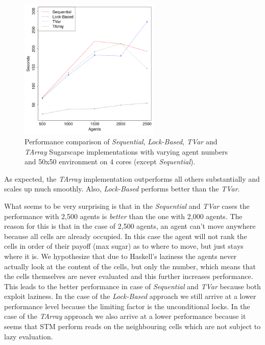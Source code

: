 \begin{figure}
	\centering
	\includegraphics[width=0.6\textwidth, angle=0]{./fig/concurrentabs/sugarscape/sugarscape_varyingagents_constcores.png}
	\caption{Performance comparison of \textit{Sequential}, \textit{Lock-Based}, \textit{TVar} and \textit{TArray} Sugarscape implementations with varying agent numbers and 50x50 environment on 4 cores (except \textit{Sequential}).}
	\label{fig:sugarscape_varyingagents_constcores}
\end{figure}

As expected, the \textit{TArray} implementation outperforms all others substantially and scales up much smoothly. Also, \textit{Lock-Based} performs better than the \textit{TVar}.

What seems to be very surprising is that in the \textit{Sequential} and \textit{TVar} cases the performance with 2,500 agents is \textit{better} than the one with 2,000 agents. The reason for this is that in the case of 2,500 agents, an agent can't move anywhere because all cells are already occupied. In this case the agent will not rank the cells in order of their payoff (max sugar) as to where to move, but just stays where it is. We hypothesize that due to Haskell's laziness the agents never actually look at the content of the cells, but only the number, which means that the cells themselves are never evaluated and this further increases performance. This leads to the better performance in case of \textit{Sequential} and \textit{TVar} because both exploit laziness. 
In the case of the \textit{Lock-Based} approach we still arrive at a lower performance level because the limiting factor is the unconditional locks. In the case of the \textit{TArray} approach we also arrive at a lower performance because it seems that STM perform reads on the neighbouring cells which are not subject to lazy evaluation.


